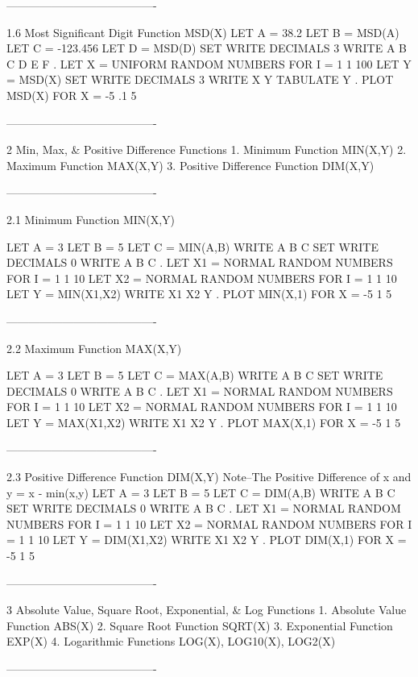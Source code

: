 ----------------------------------------
 
1.6
Most Significant Digit Function MSD(X)
      LET A = 38.2
      LET B = MSD(A)
      LET C = -123.456
      LET D = MSD(D)
      SET WRITE DECIMALS 3
      WRITE A B C D E F
      .
      LET X = UNIFORM RANDOM NUMBERS FOR I = 1 1 100
      LET Y = MSD(X)
      SET WRITE DECIMALS 3
      WRITE X Y
      TABULATE Y
      .
      PLOT MSD(X) FOR X = -5 .1 5
 
----------------------------------------
 
2
Min, Max, & Positive Difference Functions
   1. Minimum Function MIN(X,Y)
   2. Maximum Function MAX(X,Y)
   3. Positive Difference Function DIM(X,Y)
 
----------------------------------------
 
2.1
Minimum Function MIN(X,Y)
 
LET A = 3
LET B = 5
LET C = MIN(A,B)
WRITE A B C
SET WRITE DECIMALS 0
WRITE A B C
.
LET X1 = NORMAL RANDOM NUMBERS FOR I = 1 1 10
LET X2 = NORMAL RANDOM NUMBERS FOR I = 1 1 10
LET Y = MIN(X1,X2)
WRITE X1 X2 Y
.
PLOT MIN(X,1) FOR X = -5 1 5
 
----------------------------------------
 
2.2
Maximum Function MAX(X,Y)
 
LET A = 3
LET B = 5
LET C = MAX(A,B)
WRITE A B C
SET WRITE DECIMALS 0
WRITE A B C
.
LET X1 = NORMAL RANDOM NUMBERS FOR I = 1 1 10
LET X2 = NORMAL RANDOM NUMBERS FOR I = 1 1 10
LET Y = MAX(X1,X2)
WRITE X1 X2 Y
.
PLOT MAX(X,1) FOR X = -5 1 5
 
----------------------------------------
 
2.3
Positive Difference Function DIM(X,Y)
Note--The Positive Difference of x and y = x - min(x,y)
      LET A = 3
      LET B = 5
      LET C = DIM(A,B)
      WRITE A B C
      SET WRITE DECIMALS 0
      WRITE A B C
      .
      LET X1 = NORMAL RANDOM NUMBERS FOR I = 1 1 10
      LET X2 = NORMAL RANDOM NUMBERS FOR I = 1 1 10
      LET Y = DIM(X1,X2)
      WRITE X1 X2 Y
      .
      PLOT DIM(X,1) FOR X = -5 1 5
 
----------------------------------------
 
3
Absolute Value, Square Root, Exponential, & Log Functions
   1. Absolute Value Function ABS(X)
   2. Square Root Function SQRT(X)
   3. Exponential Function EXP(X)
   4. Logarithmic Functions LOG(X), LOG10(X), LOG2(X)
 
----------------------------------------
 
